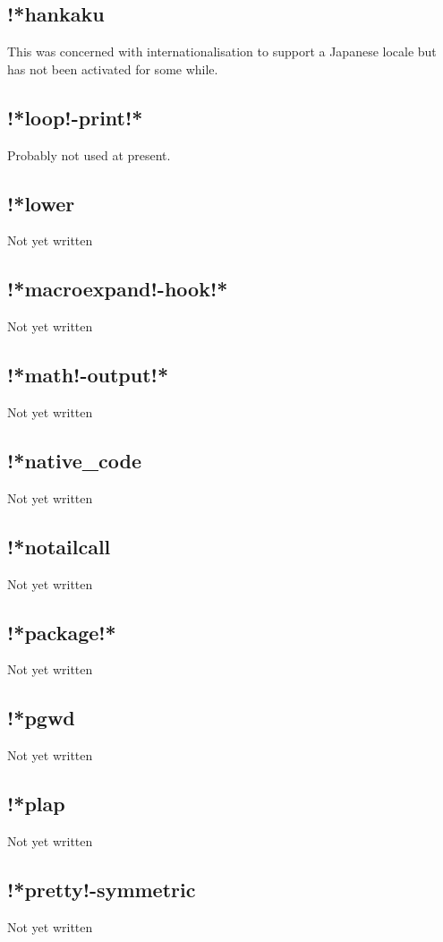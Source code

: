 \documentclass[a4paper,11pt]{article}
\begin{document}
\subsection{\ttfamily !*hankaku}
This was concerned with internationalisation to support a Japanese
locale but has not been activated for some while.
\subsection{\ttfamily !*loop!-print!*}
Probably not used at present.
\subsection{\ttfamily !*lower}
Not yet written

\subsection{\ttfamily !*macroexpand!-hook!*}
Not yet written

\subsection{\ttfamily !*math!-output!*}
Not yet written

\subsection{\ttfamily !*native\_code}
Not yet written

\subsection{\ttfamily !*notailcall}
Not yet written

\subsection{\ttfamily !*package!*}
Not yet written

\subsection{\ttfamily !*pgwd}
Not yet written

\subsection{\ttfamily !*plap}
Not yet written

\subsection{\ttfamily !*pretty!-symmetric}
Not yet written
\end{document}
